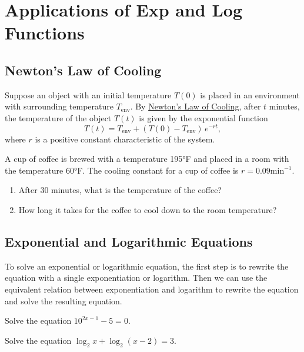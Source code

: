 

\section{Applications of Exp and Log Functions}

\hypertarget{newtons-law-of-cooling}{%
\subsection{Newton's Law of Cooling}\label{newtons-law-of-cooling}}

Suppose an object with an initial temperature \(T(0)\) is placed in an
environment with surrounding temperature \(T_{\text{env}}\). By
\href{https://en.wikipedia.org/wiki/Newton\%27s_law_of_cooling}{Newton's
Law of Cooling}, after \(t\) minutes, the temperature of the object
\(T(t)\) is given by the exponential function \[
T(t)=T_{\text{env}}+(T(0)-T_{\text{env}})\,e^{-rt},
\] where \(r\) is a positive constant characteristic of the system.

A cup of coffee is brewed with a temperature 195°F and placed in a room
with the temperature 60°F. The cooling constant for a cup of coffee is $r = 0.09 \text{min}^{-1}$.

\begin{enumerate}
\item
  After 30 minutes, what is the temperature of the coffee?
\item
  How long it takes for the coffee to cool down to the room temperature?
\end{enumerate}


\subsection{Exponential and Logarithmic Equations}

To solve an exponential or logarithmic equation, the first step is to rewrite the equation with a single exponentiation or logarithm.
Then we can use the equivalent relation between exponentiation and logarithm to rewrite the equation and solve the resulting equation.

\begin{example}

Solve the equation \(10^{2x-1}-5=0\).

\end{example}
\vspace*{6\baselineskip}

\begin{example}

Solve the equation \(\log_2 x + \log_2 (x - 2) = 3\).

\end{example}
\vspace*{6\baselineskip}

